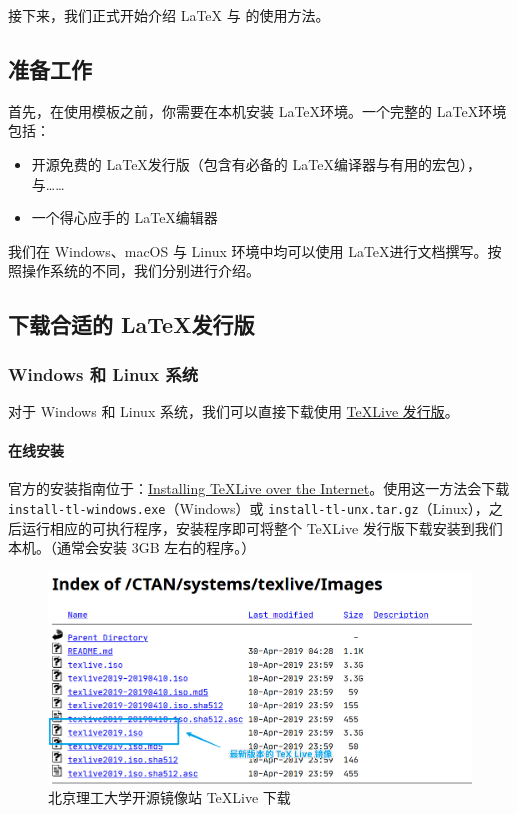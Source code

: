 接下来，我们正式开始介绍 {\LaTeX} 与 {\BIThesis} 的使用方法。

\subsection{准备工作}
首先，在使用模板之前，你需要在本机安装 \LaTeX 环境。一个完整的 \LaTeX 环境包括：

\begin{itemize}
  \item 开源免费的 \LaTeX 发行版（包含有必备的 \LaTeX 编译器与有用的宏包），与……
  \item 一个得心应手的 \LaTeX 编辑器
\end{itemize}

我们在 Windows、macOS 与 Linux 环境中均可以使用 \LaTeX 进行文档撰写。按照操作系统的不同，我们分别进行介绍。

\subsection{下载合适的 \LaTeX 发行版}

\subsubsection{Windows 和 Linux 系统}
对于 Windows 和 Linux 系统，我们可以直接下载使用 \href{https://www.tug.org/texlive/}{\TeX Live 发行版}。

\paragraph{在线安装} 官方的安装指南位于：\href{https://www.tug.org/texlive/acquire-netinstall.html}{Installing \TeX Live over the Internet}。使用这一方法会下载 \texttt{install-tl-windows.exe}（Windows）或 \texttt{install-tl-unx.tar.gz}（Linux），之后运行相应的可执行程序，安装程序即可将整个 \TeX Live 发行版下载安装到我们本机。（通常会安装 3GB 左右的程序。）

\begin{figure}[H]
  \centering
  \includegraphics[width=\textwidth]{images/bit_mirror_texlive.png}
  \caption{北京理工大学开源镜像站 \TeX Live 下载}
  \label{mirrorbit}
\end{figure}


